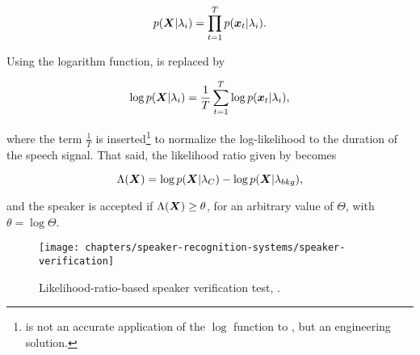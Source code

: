 \begin{equation}
    p(\dvec{X}|\lambda_i) = \prod_{t=1}^T p(\dvec{x}_t|\lambda_i).
    \label{eq:likelihood-prod}
\end{equation}

\noindent Using the logarithm function,  is replaced by

\begin{equation}
    \log p(\dvec{X}|\lambda_i) = \frac{1}{T} \sum_{t=1}^T \log p(\dvec{x}_t|\lambda_i),
    \label{eq:log-likelihood-sum}
\end{equation}

\noindent where the term $\frac{1}{T}$ is inserted\footnote{ is not an accurate application of the $\log$ function to , but an engineering solution.} to normalize the log-likelihood to the duration of the speech signal. That said, the likelihood ratio given by  becomes

\begin{equation}
    \Lambda(\dvec{X}) = \log p(\dvec{X}|\lambda_{C}) - \log p(\dvec{X}|\lambda_{bkg}),
    \label{eq:score_of_X}
\end{equation}

\noindent and the speaker is accepted if $\Lambda(\boldsymbol{X}) \geq \theta$, for an arbitrary value of $\Theta$, with $\theta = \log\Theta$.

\begin{figure}[ht]
    \centering
    \texttt{[image: chapters/speaker-recognition-systems/speaker-verification]}
    \caption{Likelihood-ratio-based speaker verification test, .}
    \label{fig:speaker-verification}
\end{figure}